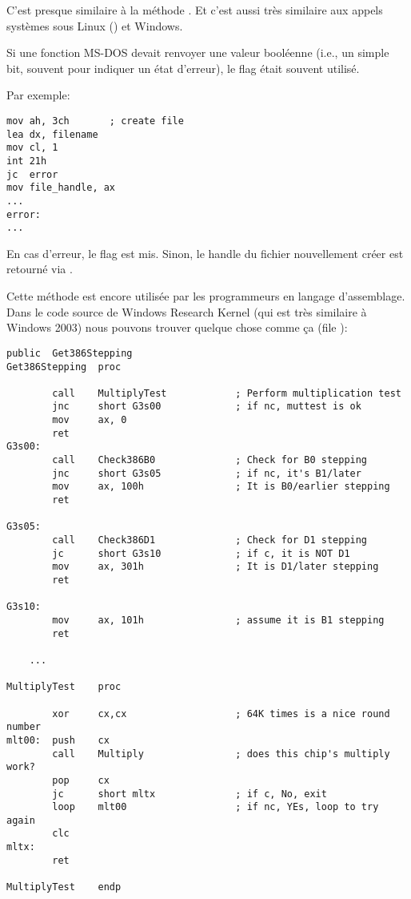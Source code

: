 C'est presque similaire à la méthode .
Et c'est aussi très similaire aux appels systèmes sous Linux () et Windows.

Si une fonction MS-DOS devait renvoyer une valeur booléenne (i.e., un simple bit,
souvent pour indiquer un état d'erreur), le flag  était souvent utilisé.

Par exemple:

\begin{lstlisting}[style=customasmx86]
mov ah, 3ch       ; create file
lea dx, filename
mov cl, 1
int 21h
jc  error
mov file_handle, ax
...
error:
...
\end{lstlisting}

En cas d'erreur, le flag  est mis. Sinon, le handle du fichier nouvellement
créer est retourné via .

Cette méthode est encore utilisée par les programmeurs en langage d'assemblage.
Dans le code source de Windows Research Kernel (qui est très similaire à Windows
2003) nous pouvons trouver quelque chose comme ça (file ):

\begin{lstlisting}[style=customasmx86]
        public  Get386Stepping
Get386Stepping  proc

        call    MultiplyTest            ; Perform multiplication test
        jnc     short G3s00             ; if nc, muttest is ok
        mov     ax, 0
        ret
G3s00:
        call    Check386B0              ; Check for B0 stepping
        jnc     short G3s05             ; if nc, it's B1/later
        mov     ax, 100h                ; It is B0/earlier stepping
        ret

G3s05:
        call    Check386D1              ; Check for D1 stepping
        jc      short G3s10             ; if c, it is NOT D1
        mov     ax, 301h                ; It is D1/later stepping
        ret

G3s10:
        mov     ax, 101h                ; assume it is B1 stepping
        ret

	...

MultiplyTest    proc

        xor     cx,cx                   ; 64K times is a nice round number
mlt00:  push    cx
        call    Multiply                ; does this chip's multiply work?
        pop     cx
        jc      short mltx              ; if c, No, exit
        loop    mlt00                   ; if nc, YEs, loop to try again
        clc
mltx:
        ret

MultiplyTest    endp
\end{lstlisting}

